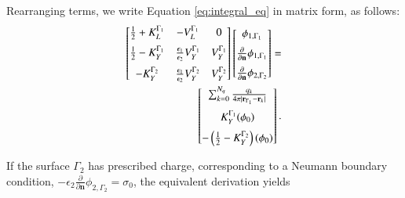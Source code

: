 \noindent Rearranging terms, we write Equation \eqref{eq:integral_eq} in matrix form, as follows:
%
 \begin{align} \label{eq:matrix_phi}
 \left[
    \begin{matrix} %
       \frac{1}{2} + K_{L}^{\Gamma_1} & -V_{L}^{\Gamma_1} & 0 \vspace{0.2cm}\\
       \frac{1}{2} - K_{Y}^{\Gamma_1} &  \frac{\epsilon_1}{\epsilon_2} V_{Y}^{\Gamma_1} & V_{Y}^{\Gamma_1} \vspace{0.2cm} \\
       - K_{Y}^{\Gamma_2} & \frac{\epsilon_1}{\epsilon_2} V_{Y}^{\Gamma_2} & V_{Y}^{\Gamma_2} \\
    \end{matrix}
    \right] \left[ 
    \begin{matrix} %
       \phi_{1,\Gamma_1} \vspace{0.2cm} \\
       \frac{\partial}{\partial \mathbf{n}} \phi_{1,\Gamma_1} \vspace{0.2cm}\\
       \frac{\partial}{\partial \mathbf{n}} \phi_{2,\Gamma_2}\\
    \end{matrix} 
     \right] =  & \nonumber \\
    \left[
    \begin{matrix} %
       \sum_{k=0}^{N_q} \frac{q_k}{4\pi|\mathbf{r}_{\Gamma_1} - \mathbf{r}_k|} \vspace{0.2cm} \\
        K_{Y}^{\Gamma_1}(\phi_{0}) \vspace{0.2cm} \\
        -\left(\frac{1}{2} - K_{Y}^{\Gamma_2}\right) (\phi_0)
    \end{matrix}
    \right].
 \end{align}

\medskip
\noindent If the surface $\Gamma_2$ has prescribed charge, corresponding to a Neumann boundary condition, $-\epsilon_2\frac{\partial}{\partial \mathbf{n}} \phi_{2,\Gamma_2} = \sigma_0$, the equivalent derivation yields

